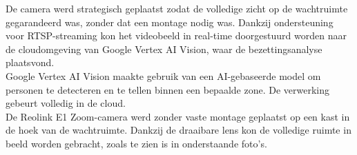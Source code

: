 De camera werd strategisch geplaatst zodat de volledige zicht op de wachtruimte gegarandeerd was, zonder dat een  montage nodig was. Dankzij ondersteuning voor RTSP-streaming kon het videobeeld in real-time doorgestuurd worden naar de cloudomgeving van Google Vertex AI Vision, waar de bezettingsanalyse plaatsvond. \\

Google Vertex AI Vision maakte gebruik van een AI-gebaseerde model om personen te detecteren en te tellen binnen een bepaalde zone. De verwerking gebeurt volledig in de cloud. \\

De Reolink E1 Zoom-camera werd zonder vaste montage geplaatst op een kast in de hoek van de wachtruimte. Dankzij de draaibare lens kon de volledige ruimte in beeld worden gebracht, zoals te zien is in onderstaande foto’s.

